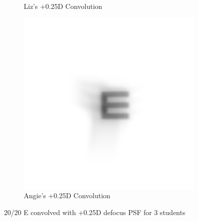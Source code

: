 \documentclass{article}
\begin{document}
\begin{figure}[H]
\begin{subfigure}{.3\textwidth}
  \caption{Liz's +0.25D Convolution}
  \label{fig:liz025d}
\end{subfigure}
\begin{subfigure}{.3\textwidth}
  \centering
  \includegraphics[width=1\linewidth]{Angie_R_0526_1_500_zer_025_5_PSF_convE.png}
  \caption{Angie's +0.25D Convolution}
  \label{fig:angie025d}
\end{subfigure}

\caption{20/20 E convolved with +0.25D defocus PSF for 3 students}
\label{fig:Defocus_025D}
\end{figure}

\clearpage
\end{document}

